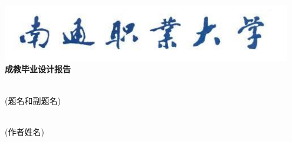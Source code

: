 \begin{titlepage}
\vspace{1em}
\begin{center}
\includegraphics[width=0.95\textwidth]{body/titlepage/title.jpg}\\\vspace{1.2em}
{
\cukai \fontsize{40pt}{\baselineskip}\selectfont \textbf{成教毕业设计报告}
}\par\vspace{3.3em}
\noindent\underline{}
\vspace{1.5em}\par
\noindent\underline{}\\
{
\vspace{0em}\normalsize\normalfont (题名和副题名)
}\vspace{2em}\par
\hspace{2em}\underline{}\\
{\vspace{0em}\normalsize\normalfont (作者姓名)}
\end{center}
\par\vspace{2.5em}\fontsize{14.4pt}{\baselineskip}\selectfont 

\end{titlepage}
